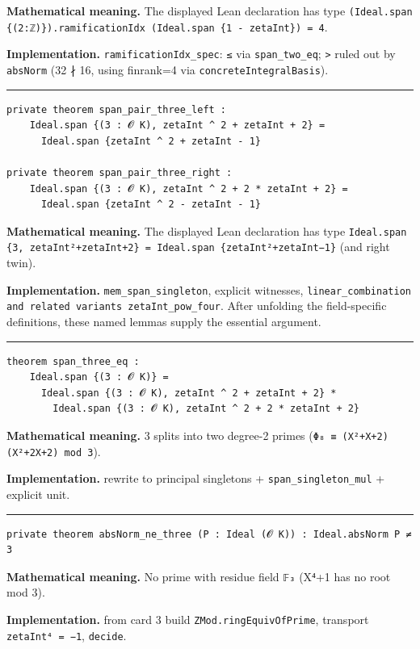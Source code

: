 \documentclass[UTF8,a4paper,11pt,fontset=fandol]{ctexart}
\theoremstyle{definition}
\newcommand{\statementsep}{\par\medskip\hrule\medskip}
\begin{document}
\noindent\textbf{Mathematical meaning.} The displayed Lean declaration has type \texttt{(Ideal.\allowbreak{}span \{(2:ℤ)\}).\allowbreak{}ramificationIdx (Ideal.\allowbreak{}span \{1 - zetaInt\}) = 4}.\par
\noindent\textbf{Implementation.} \texttt{ramificationIdx\_\allowbreak{}spec}: \texttt{≤} via \texttt{span\_\allowbreak{}two\_\allowbreak{}eq}; \texttt{>} ruled out by \texttt{absNorm} (32 ∤ 16, using finrank=4 via \texttt{concreteIntegralBasis}).\par
\statementsep
\begin{verbatim}
private theorem span_pair_three_left :
    Ideal.span {(3 : 𝓞 K), zetaInt ^ 2 + zetaInt + 2} =
      Ideal.span {zetaInt ^ 2 + zetaInt - 1}

private theorem span_pair_three_right :
    Ideal.span {(3 : 𝓞 K), zetaInt ^ 2 + 2 * zetaInt + 2} =
      Ideal.span {zetaInt ^ 2 - zetaInt - 1}
\end{verbatim}
\noindent\textbf{Mathematical meaning.} The displayed Lean declaration has type \texttt{Ideal.\allowbreak{}span \{3, zetaInt²+zetaInt+2\} = Ideal.\allowbreak{}span \{zetaInt²+zetaInt−1\}} (and right twin).\par
\noindent\textbf{Implementation.} \texttt{mem\_\allowbreak{}span\_\allowbreak{}singleton}, explicit witnesses, \texttt{linear\_\allowbreak{}combination and related variants zetaInt\_\allowbreak{}pow\_\allowbreak{}four}. After unfolding the field-specific definitions, these named lemmas supply the essential argument.\par
\statementsep
\begin{verbatim}
theorem span_three_eq :
    Ideal.span {(3 : 𝓞 K)} =
      Ideal.span {(3 : 𝓞 K), zetaInt ^ 2 + zetaInt + 2} *
        Ideal.span {(3 : 𝓞 K), zetaInt ^ 2 + 2 * zetaInt + 2}
\end{verbatim}
\noindent\textbf{Mathematical meaning.} 3 splits into two degree-2 primes (\texttt{Φ₈ ≡ (X²+X+2)(X²+2X+2) mod 3}).\par
\noindent\textbf{Implementation.} rewrite to principal singletons + \texttt{span\_\allowbreak{}singleton\_\allowbreak{}mul} + explicit unit.\par
\statementsep
\begin{verbatim}
private theorem absNorm_ne_three (P : Ideal (𝓞 K)) : Ideal.absNorm P ≠ 3
\end{verbatim}
\noindent\textbf{Mathematical meaning.} No prime with residue field \texttt{𝔽₃} (X⁴+1 has no root mod 3).\par
\noindent\textbf{Implementation.} from card 3 build \texttt{ZMod.\allowbreak{}ringEquivOfPrime}, transport \texttt{zetaInt⁴ = −1}, \texttt{decide}.\par
\end{document}
